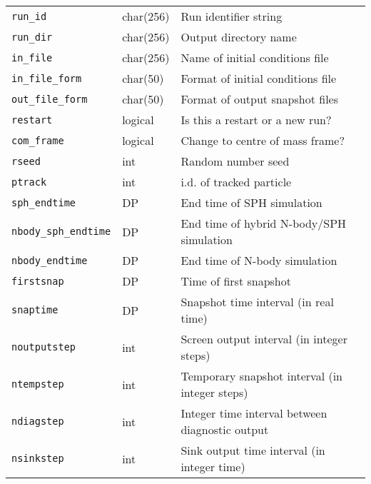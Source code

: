 \documentclass[a4paper]{article}
\newcommand{\var}[1]{\texttt{#1}}
\begin{document}
\tabletail{\hline}
\tablelasttail{\hline}
\begin{center}
\begin{supertabular}{|p{3cm}|p{2cm}|p{8cm}|}

\var{run\_id}    & char(256) & Run identifier string \\
\var{run\_dir}   & char(256) & Output directory name \\
\var{in\_file}   & char(256) & Name of initial conditions file \\
\var{in\_file\_form}  & char(50) & Format of initial conditions file \\
\var{out\_file\_form} & char(50) & Format of output snapshot files \\ \hline
\var{restart}    & logical   & Is this a restart or a new run? \\ 
\var{com\_frame} & logical   & Change to centre of mass frame? \\
\var{rseed}      & int       & Random number seed \\
\var{ptrack}     & int       & i.d. of tracked particle \\ \hline
\var{sph\_endtime}   & DP  & End time of SPH simulation \\
\var{nbody\_sph\_endtime} & DP & End time of hybrid N-body/SPH simulation \\
\var{nbody\_endtime} & DP    & End time of N-body simulation \\
\var{firstsnap}  & DP        & Time of first snapshot \\
\var{snaptime}   & DP        & Snapshot time interval (in real time) \\
\var{noutputstep}& int       & Screen output interval (in integer steps) \\
\var{ntempstep}  & int       & Temporary snapshot interval (in integer steps) \\
\var{ndiagstep}  & int       & Integer time interval between diagnostic output \\
\var{nsinkstep}  & int       & Sink output time interval (in integer time) \\ 

\end{supertabular}
\end{center}
\end{document}
